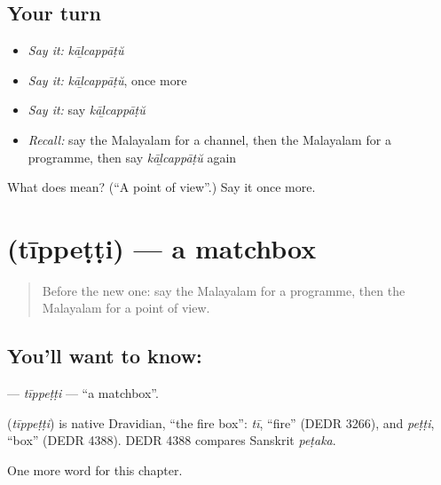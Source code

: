 \subsection*{Your turn}
\begin{itemize}
\raggedright
  \item \emph{Say it:} \emph{kāḻcappāṭŭ}
  \item \emph{Say it:} \emph{kāḻcappāṭŭ}, once more
  \item \emph{Say it:} say \emph{kāḻcappāṭŭ}
  \item \emph{Recall:} say the Malayalam for a channel, then the Malayalam for a programme, then say \emph{kāḻcappāṭŭ} again
\end{itemize}

\begin{tcolorbox}[breakable,colback=teal!4,colframe=teal!35!black,title={Before you move on}]
What does  mean? (\textquotedblleft{}A point of view\textquotedblright{}.) Say it once more.
\end{tcolorbox}
\section[\texorpdfstring{\ml{തീപ്പെട്ടി} (tīppeṭṭi)}{തീപ്പെട്ടി (tīppeṭṭi)}]{ (tīppeṭṭi) — a matchbox}

\label{lesson:ML-C294-tippetti}



\begin{quote}
Before the new one: say the Malayalam for a programme, then the Malayalam for a point of view.
\end{quote}

\subsection*{You'll want to know: }
\textbf{} — \emph{tīppeṭṭi} — \textquotedblleft{}a matchbox\textquotedblright{}.

\begin{cousinweb}
\textbf{} (\emph{tīppeṭṭi}) is native Dravidian, \textquotedblleft{}the fire box\textquotedblright{}: \emph{tī}, \textquotedblleft{}fire\textquotedblright{} (DEDR 3266), and \emph{peṭṭi}, \textquotedblleft{}box\textquotedblright{} (DEDR 4388). DEDR 4388 compares Sanskrit \emph{peṭaka}.
\end{cousinweb}

\begin{grammarlens}[title={What you've built}]
One more word for this chapter.
\end{grammarlens}

